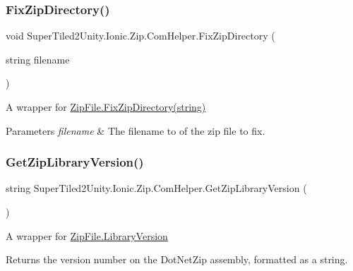 \subsubsection{\texorpdfstring{Fix\+Zip\+Directory()}{FixZipDirectory()}}
{\footnotesize\ttfamily void Super\+Tiled2\+Unity.\+Ionic.\+Zip.\+Com\+Helper.\+Fix\+Zip\+Directory (\begin{DoxyParamCaption}\item[{string}]{filename }\end{DoxyParamCaption})}



A wrapper for \mbox{\hyperlink{class_super_tiled2_unity_1_1_ionic_1_1_zip_1_1_zip_file_aca101c62532b74ff851ba8f18e0c9091}{Zip\+File.\+Fix\+Zip\+Directory(string)}} 


\begin{DoxyParams}{Parameters}
{\em filename} & The filename to of the zip file to fix.\\
\hline
\end{DoxyParams}
\mbox{\label{class_super_tiled2_unity_1_1_ionic_1_1_zip_1_1_com_helper_a32cc8afaeb0291f0ed3f84a3082ac056}} 
\subsubsection{\texorpdfstring{Get\+Zip\+Library\+Version()}{GetZipLibraryVersion()}}
{\footnotesize\ttfamily string Super\+Tiled2\+Unity.\+Ionic.\+Zip.\+Com\+Helper.\+Get\+Zip\+Library\+Version (\begin{DoxyParamCaption}{ }\end{DoxyParamCaption})}



A wrapper for \mbox{\hyperlink{class_super_tiled2_unity_1_1_ionic_1_1_zip_1_1_zip_file_ac9c12c0e7927c8d1fff6abd5f80e1125}{Zip\+File.\+Library\+Version}} 

\begin{DoxyReturn}{Returns}
the version number on the Dot\+Net\+Zip assembly, formatted as a string. 
\end{DoxyReturn}
\mbox{\label{class_super_tiled2_unity_1_1_ionic_1_1_zip_1_1_com_helper_abdd05ac40eb679e9a994426d80d272aa}} 
